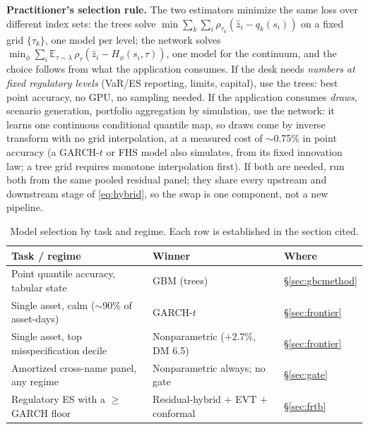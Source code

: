 \documentclass[11pt]{article}
\theoremstyle{remark}
\begin{document}
\noindent\textbf{Practitioner's selection rule.} The two estimators
minimize the same loss over different index sets: the trees solve
$\min \sum_{k}\sum_{i}\rho_{\tau_k}(\widehat{z}_i - q_k(s_i))$ on a
fixed grid $\{\tau_k\}$, one model per level; the network solves
$\min_\phi \sum_i \mathbb{E}_{\tau\sim\lambda}\,
\rho_\tau(\widehat{z}_i - H_\phi(s_i,\tau))$, one model for the continuum, and the choice follows from what the application consumes.
If the desk needs \emph{numbers at fixed regulatory levels} (VaR/ES
reporting, limits, capital), use the trees: best point accuracy, no
GPU, no sampling needed. If the application consumes \emph{draws}, scenario generation, portfolio aggregation by simulation, use the network: it learns one continuous conditional quantile map, so
draws come by inverse transform with no grid interpolation, at a
measured cost of $\sim$0.75\% in point accuracy (a GARCH-$t$ or FHS
model also simulates, from its fixed innovation law; a tree grid
requires monotone interpolation first). If both are needed,
run both from the same pooled residual panel; they share every upstream
and downstream stage of \eqref{eq:hybrid}, so the swap is one component,
not a new pipeline.

\medskip\noindent{}

\begin{table}[t]
\centering\small
\caption{Model selection by task and regime.
Each row is established in the section cited.}
\label{tab:decision}
\begin{tabular}{p{}p{}l}
\toprule
Task / regime & Winner & Where \\
\midrule
Point quantile accuracy, tabular state & GBM (trees) & \S\ref{sec:gbcmethod} \\
Single asset, calm ($\sim$90\% of asset-days) & GARCH-$t$ & \S\ref{sec:frontier} \\
Single asset, top misspecification decile & Nonparametric ($+2.7\%$, DM 6.5) & \S\ref{sec:frontier} \\
Amortized cross-name panel, any regime & Nonparametric always; no gate & \S\ref{sec:gate} \\
Regulatory ES with a $\ge$GARCH floor & Residual-hybrid $+$ EVT $+$ conformal & \S\ref{sec:frtb} \\
\bottomrule
\end{tabular}
\end{table}
\end{document}
